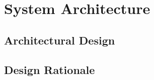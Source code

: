 \section{System Architecture} %
\label{sec:system_architecture}
\subsection{Architectural Design} %
\label{sub:arichtectural_design}
\label{sub:decom}

\subsection{Design Rationale} %
\label{sub:design_rationale}

